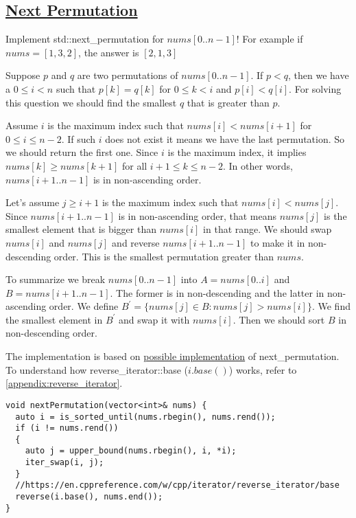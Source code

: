 \documentclass{book}
\begin{document}
	\subsection{\href{https://leetcode.com/problems/next-permutation/}{Next Permutation}}
	Implement std::next\_permutation for $nums[0..n-1]$! For example if $nums = [1, 3, 2]$, the answer is $[2, 1,3]$
	\par Suppose $p$ and $q$ are two permutations of $nums[0..n - 1]$. If $p < q$, then we have a $0 \le i < n$ such that $p[k] = q[k]$ for $0 \le k < i$ and $p[i] < q[i]$. For solving this question we should find the smallest $q$ that is greater than $p$.
	\par Assume $i$ is the maximum index such that $nums[i] < nums[i + 1]$ for $0 \le i \le n - 2$. If such $i$ does not exist it means we have the last permutation. So we should return the first one. Since $i$ is the maximum index, it implies $nums[k] \ge nums[k + 1]$ for all $i + 1 \le k \le n - 2$. In other words, $nums[i + 1..n - 1]$ is in non-ascending order.
	\par Let's assume $j \ge i + 1$ is the maximum index such that $nums[i] < nums[j]$. Since $nums[i + 1..n - 1]$ is in non-ascending order, that means $nums[j]$ is the smallest element that is bigger than $nums[i]$ in that range. We should swap $nums[i]$ and $nums[j]$ and reverse $nums[i + 1..n - 1]$ to make it in non-descending order. This is the smallest permutation greater than $nums$.
	\par To summarize we break $nums[0..n - 1]$ into $A = nums[0..i]$ and $B = nums[i + 1..n - 1]$. The former is in non-descending and the latter in non-ascending order. We define $B^{\prime} = \{nums[j] \in B : nums[j] > nums[i]\}$. We find the smallest element in $B^{\prime}$ and swap it with $nums[i]$. Then we should sort $B$ in non-descending order.
	\par The implementation is based on \href{https://en.cppreference.com/w/cpp/algorithm/next_permutation}{possible implementation} of next\_permutation. To understand how reverse\_iterator::base ($i.base()$) works, refer to \ref{appendix:reverse_iterator}.
	\begin{lstlisting}
void nextPermutation(vector<int>& nums) {
  auto i = is_sorted_until(nums.rbegin(), nums.rend());
  if (i != nums.rend())
  {
    auto j = upper_bound(nums.rbegin(), i, *i);
    iter_swap(i, j);
  }
  //https://en.cppreference.com/w/cpp/iterator/reverse_iterator/base
  reverse(i.base(), nums.end());
}
	\end{lstlisting}
\end{document}
